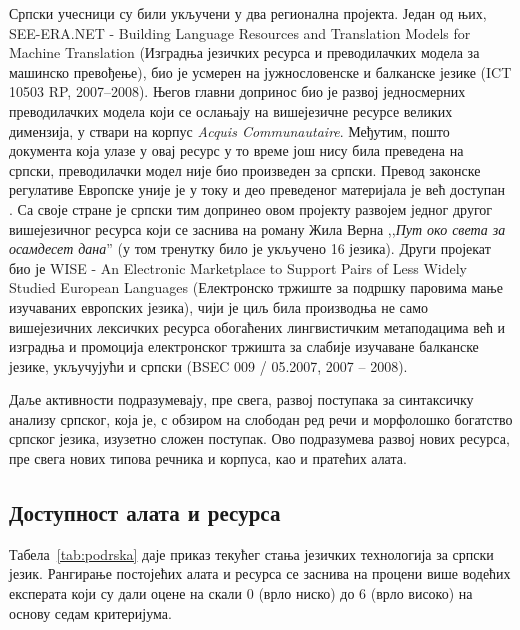 \begin{multicols}{2}
Српски учесници су били укључени у два регионална пројекта. Један од њих, SEE-ERA.NET - Building Language Resources and Translation Models for Machine Translation (Изградња језичких ресурса и преводилачких модела за машинско превођење), био је усмерен на јужнословенске и балканске језике (ICT 10503 RP, 2007--2008). Његов главни допринос био је развој једносмерних преводилачких модела који се ослањају на вишејезичне ресурсе великих димензија, у ствари на корпус \textit{Acquis Communautaire}.  Међутим, пошто документа која улазе у овај ресурс у то време још нису била преведена на српски, преводилачки модел није био произведен за српски. Превод законске регулативе Европске уније је у току и део преведеног материјала је већ доступан \cite{PREVODJENJE}. Са своје стране је српски тим допринео овом пројекту развојем једног другог вишејезичног ресурса који се заснива на роману Жила Верна ,,\textit{Пут око света за осамдесет дана}'' (у том тренутку било је укључено 16 језика). Други пројекат био је WISE - An Electronic Marketplace to Support Pairs of Less Widely Studied European Languages (Електронско тржиште за подршку паровима мање изучаваних европских језика), чији је циљ била производња не само вишејезичних лексичких ресурса обогаћених лингвистичким метаподацима већ и изградња и промоција електронског тржишта за слабије изучаване балканске језике, укључујући и српски (BSEC 009 / 05.2007, 2007 -- 2008).

Даље активности подразумевају, пре свега, развој поступака за синтаксичку анализу српског, која је, с обзиром на слободан ред речи и морфолошко богатство српског језика, изузетно сложен поступак. Ово подразумева развој нових ресурса, пре свега нових типова речника и корпуса, као и пратећих алата.
 
 \subsection {Доступност алата и ресурса}
   
Табела~\ref{tab:podrska} даје приказ текућег стања језичких технологија за српски језик. Рангирање постојећих алата и ресурса се заснива на процени више водећих експерата који су дали оцене на скали 0 (врло ниско) до 6 (врло високо) на основу седам критеријума. 



\begin{table}[ht]
\centering


\end{table}
\end{multicols}
